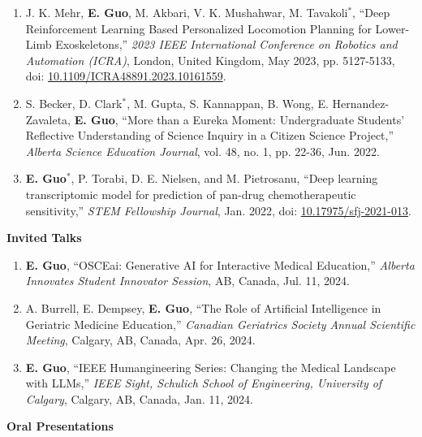 \documentclass{article}
\begin{document}
\begin{enumerate}
    \item J. K. Mehr, \textbf{E. Guo}, M. Akbari, V. K. Mushahwar, M. Tavakoli$^*$, ``Deep Reinforcement Learning Based Personalized Locomotion Planning for Lower-Limb Exoskeletons,'' \textit{2023 IEEE International Conference on Robotics and Automation (ICRA)}, London, United Kingdom, May 2023, pp. 5127-5133, doi: \href{https://doi.org/10.1109/ICRA48891.2023.10161559}{10.1109/ICRA48891.2023.10161559}.
    \item S. Becker, D. Clark$^*$, M. Gupta, S. Kannappan, B. Wong, E. Hernandez-Zavaleta, \textbf{E. Guo}, ``More than a Eureka Moment: Undergraduate Students' Reflective Understanding of Science Inquiry in a Citizen Science Project,'' \textit{Alberta Science Education Journal}, vol. 48, no. 1, pp. 22-36, Jun. 2022.
    \item \textbf{E. Guo$^*$}, P. Torabi, D. E. Nielsen, and M. Pietrosanu, ``Deep learning transcriptomic model for prediction of pan-drug chemotherapeutic sensitivity,'' \textit{STEM Fellowship Journal}, Jan. 2022, doi: \href{https://doi.org/10.17975/sfj-2021-013}{10.17975/sfj-2021-013}.
\end{enumerate} \vspace{1em}

\textbf{Invited Talks} \vspace{.5em}

\begin{enumerate}
    \item \textbf{E. Guo}, ``OSCEai: Generative AI for Interactive Medical Education,'' \textit{Alberta Innovates Student Innovator Session}, AB, Canada, Jul. 11, 2024.
    \item A. Burrell, E. Dempsey, \textbf{E. Guo}, ``The Role of Artificial Intelligence in Geriatric Medicine Education,'' \textit{Canadian Geriatrics Society Annual Scientific Meeting}, Calgary, AB, Canada, Apr. 26, 2024.
    \item \textbf{E. Guo}, ``IEEE Humangineering Series: Changing the Medical Landscape with LLMs,'' \textit{IEEE Sight, Schulich School of Engineering, University of Calgary}, Calgary, AB, Canada, Jan. 11, 2024.
\end{enumerate} \vspace{1em}

\textbf{Oral Presentations} \vspace{.5em}
\end{document}
